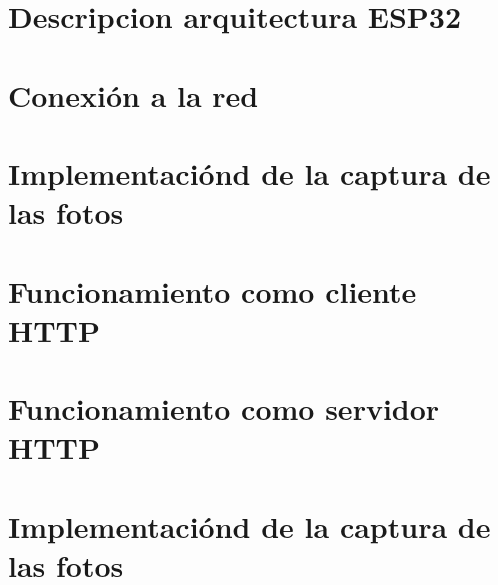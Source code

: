
\section{Descripcion arquitectura ESP32}

\section{Conexión a la red} 

\section{Implementaciónd de la captura de las fotos}

\section{Funcionamiento como cliente HTTP} 

\section{Funcionamiento como servidor HTTP} 

\section{Implementaciónd de la captura de las fotos}
